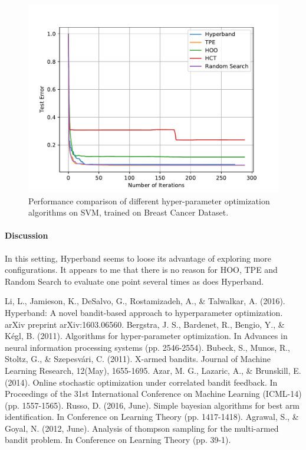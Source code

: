 \documentclass[runningheads,a4paper]{llncs}
\begin{document}
\begin{figure}[ht]
    \centering
    \includegraphics[scale=0.8]{img/uci/svm_1.pdf}
    \caption{Performance comparison of different hyper-parameter optimization algorithms on SVM, trained on Breast Cancer Dataset.}
    \label{svm_1}
\end{figure}

\paragraph{\textbf{Discussion}} In this setting, Hyperband seems to loose its advantage of exploring more configurations. It appears to me that there is no reason for HOO, TPE and Random Search to evaluate one point several times as does Hyperband.

\begin{thebibliography}{4}

 Li, L., Jamieson, K., DeSalvo, G., Rostamizadeh, A., \& Talwalkar, A. (2016). Hyperband: A novel bandit-based approach to hyperparameter optimization. arXiv preprint arXiv:1603.06560.
 Bergstra, J. S., Bardenet, R., Bengio, Y., \& Kégl, B. (2011). Algorithms for hyper-parameter optimization. In Advances in neural information processing systems (pp. 2546-2554).
 Bubeck, S., Munos, R., Stoltz, G., \& Szepesvári, C. (2011). X-armed bandits. Journal of Machine Learning Research, 12(May), 1655-1695.
 Azar, M. G., Lazaric, A., \& Brunskill, E. (2014). Online stochastic optimization under correlated bandit feedback. In Proceedings of the 31st International Conference on Machine Learning (ICML-14) (pp. 1557-1565).
 Russo, D. (2016, June). Simple bayesian algorithms for best arm identification. In Conference on Learning Theory (pp. 1417-1418).
 Agrawal, S., \& Goyal, N. (2012, June). Analysis of thompson sampling for the multi-armed bandit problem. In Conference on Learning Theory (pp. 39-1).

\end{thebibliography}


\end{document}
